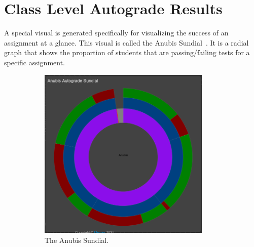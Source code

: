 \section{Class Level Autograde Results}\label{sec:class-level-results}

A special visual is generated specifically for visualizing the success of an assignment at a glance.
This visual is called the Anubis Sundial~.
It is a radial graph that shows the proportion of students that are passing/failing tests
for a specific assignment.

\begin{figure}[ht]
    \centering
    \begin{subfigure}{0.5\textwidth}
        \centering
        \includegraphics[width=0.9\textwidth]{figures/sundial-1.png}
        \caption{The Anubis Sundial.\label{fig:autograde-sundial-1} }
    \end{subfigure}%
    \begin{subfigure}{0.5\textwidth}
        \centering

\end{subfigure}
\end{figure}
